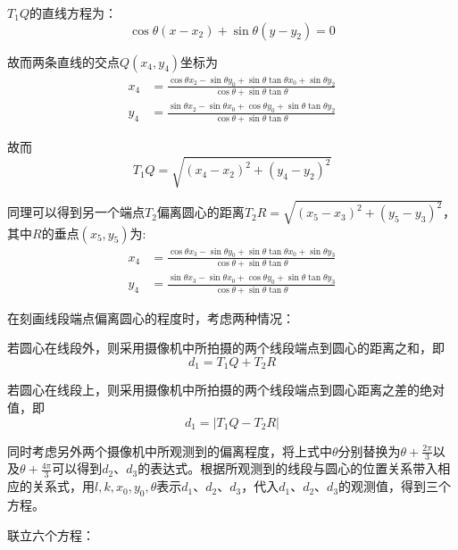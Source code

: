 \documentclass[a4paper,10.5pt]{ctexart}
\begin{document}
\par $T_1Q$的直线方程为：$$\cos\theta(x-x_2)+\sin\theta(y-y_2)=0$$
\par 故而两条直线的交点$Q(x_4,y_4)$坐标为
\begin{equation}
\begin{aligned}
x_4&=\frac{\cos\theta x_2-\sin\theta y_0+\sin\theta \tan\theta x_0+\sin\theta y_2}{\cos\theta+\sin\theta \tan\theta}\\
y_4&=\frac{\sin\theta x_2-\sin\theta x_0+\cos\theta y_0+\sin\theta \tan\theta y_2}{\cos\theta+\sin\theta \tan\theta}
\end{aligned}
\end{equation}
\par 故而
$$T_1Q=\sqrt{(x_4-x_2)^2+(y_4-y_2)^2}$$
\par 同理可以得到另一个端点$T_2$偏离圆心的距离$T_2R=\sqrt{(x_5-x_3)^2+(y_5-y_3)^2}$，其中$R$的垂点$(x_5,y_5)$为:
\begin{equation}
\begin{aligned}
x_4&=\frac{\cos\theta x_3-\sin\theta y_0+\sin\theta \tan\theta x_0+\sin\theta y_3}{\cos\theta+\sin\theta \tan\theta}\\
y_4&=\frac{\sin\theta x_3-\sin\theta x_0+\cos\theta y_0+\sin\theta \tan\theta y_3}{\cos\theta+\sin\theta \tan\theta}
\end{aligned}
\end{equation}
\par 在刻画线段端点偏离圆心的程度时，考虑两种情况：
\par 若圆心在线段外，则采用摄像机中所拍摄的两个线段端点到圆心的距离之和，即$$d_1=T_1Q+T_2R$$
\par 若圆心在线段上，则采用摄像机中所拍摄的两个线段端点到圆心距离之差的绝对值，即$$d_1=|T_1Q-T_2R|$$
\par 同时考虑另外两个摄像机中所观测到的偏离程度，将上式中$\theta$分别替换为$\theta+\frac{2\pi}{3}$以及$\theta+\frac{4\pi}{3}$可以得到$d_2$、$d_3$的表达式。根据所观测到的线段与圆心的位置关系带入相应的关系式，用$l,k,x_0,y_0,\theta$表示$d_1$、$d_2$、$d_3$，代入$d_1$、$d_2$、$d_3$的观测值，得到三个方程。
\par 联立六个方程：
\end{document}
